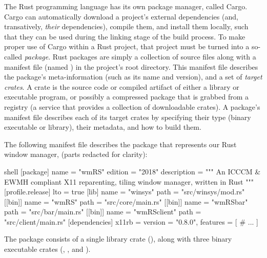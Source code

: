The Rust programming language has its own package manager, called
\textup{Cargo}. \textup{Cargo} can automatically download a project's external
dependencies (and, transatively, \textit{their} dependencies), compile them, and
install them locally, such that they can be used during the linking stage of the
build process\cite{thecargobook}. To make proper use of \textup{Cargo} within
a Rust project, that project must be turned into a so-called \textit{package}.
Rust packages are simply a collection of source files along with a manifest file
(named ) in the project's root directory. This manifest file
describes the package's meta-information (such as its name and version), and a
set of \textit{target crates}\cite{thecargobook}. A crate is the source code
or compiled artifact of either a library or executable program, or possibly a
compressed package that is grabbed from a registry (a service that provides a
collection of downloadable crates)\cite{thecargobook}. A package's manifest file
describes each of its target crates by specifying their type (binary executable
or library), their metadata, and how to build them\cite{thecargobook}.

The following manifest file describes the package that represents our Rust
window manager, \wmrs (parts redacted for clarity):

\begin{mintedblock}{shell}
  [package]
  name = "wmRS"
  edition = "2018"
  description = """
  An ICCCM & EWMH compliant X11 reparenting,
  tiling window manager, written in Rust
  """
  [profile.release]
  lto = true
  [lib]
  name = "winsys"
  path = "src/winsys/mod.rs"
  [[bin]]
  name = "wmRS"
  path = "src/core/main.rs"
  [[bin]]
  name = "wmRSbar"
  path = "src/bar/main.rs"
  [[bin]]
  name = "wmRSclient"
  path = "src/client/main.rs"
  [dependencies]
  x11rb = {
    version = "0.8.0",
    features = [
      # ...
    ]
  }
\end{mintedblock}


The package consists of a single library crate (), along with three
binary executable crates (, , and ).


